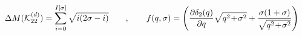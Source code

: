 \begin{equation}
\Delta M({\cal K}_{22}^{(d)})=\sum_{i=0}^{I[\sigma]}\sqrt{i(2\sigma-i)}\qquad , \qquad f(q,\sigma )=\left(
\frac{\partial \delta_2(q)}{\partial q} \sqrt{q^2\!+\!\sigma^2}
+\frac{\sigma(1+\sigma)}{\sqrt{q^2\!+\!\sigma^2}} \right)\label{eq:cont}
\end{equation}


